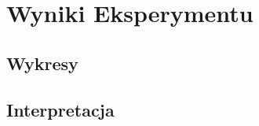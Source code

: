 \documentclass[11pt]{article}
\begin{document}
\section{Wyniki Eksperymentu}    
\subsection{Wykresy}
\subsection{Interpretacja}
\end{document}
